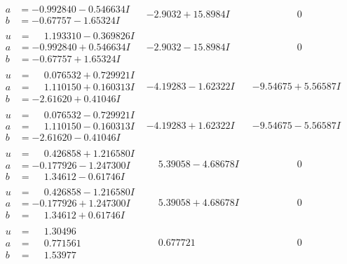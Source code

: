\documentclass[1p]{elsarticle_modified}
\theoremstyle{definition}
\begin{document}
$$\begin{array}{c|c|c}
\begin{aligned}
a &= -0.992840 - 0.546634 I \\
b &= -0.67757 - 1.65324 I\end{aligned}
 & -2.9032 + 15.8984 I & \phantom{-0.000000 } 0 \\ \hline\begin{aligned}
u &= \phantom{-}1.193310 - 0.369826 I \\
a &= -0.992840 + 0.546634 I \\
b &= -0.67757 + 1.65324 I\end{aligned}
 & -2.9032 - 15.8984 I & \phantom{-0.000000 } 0 \\ \hline\begin{aligned}
u &= \phantom{-}0.076532 + 0.729921 I \\
a &= \phantom{-}1.110150 + 0.160313 I \\
b &= -2.61620 + 0.41046 I\end{aligned}
 & -4.19283 - 1.62322 I & -9.54675 + 5.56587 I \\ \hline\begin{aligned}
u &= \phantom{-}0.076532 - 0.729921 I \\
a &= \phantom{-}1.110150 - 0.160313 I \\
b &= -2.61620 - 0.41046 I\end{aligned}
 & -4.19283 + 1.62322 I & -9.54675 - 5.56587 I \\ \hline\begin{aligned}
u &= \phantom{-}0.426858 + 1.216580 I \\
a &= -0.177926 - 1.247300 I \\
b &= \phantom{-}1.34612 - 0.61746 I\end{aligned}
 & \phantom{-}5.39058 - 4.68678 I & \phantom{-0.000000 } 0 \\ \hline\begin{aligned}
u &= \phantom{-}0.426858 - 1.216580 I \\
a &= -0.177926 + 1.247300 I \\
b &= \phantom{-}1.34612 + 0.61746 I\end{aligned}
 & \phantom{-}5.39058 + 4.68678 I & \phantom{-0.000000 } 0 \\ \hline\begin{aligned}
u &= \phantom{-}1.30496\phantom{ +0.000000I} \\
a &= \phantom{-}0.771561\phantom{ +0.000000I} \\
b &= \phantom{-}1.53977\phantom{ +0.000000I}\end{aligned}
 & \phantom{-}0.677721\phantom{ +0.000000I} & \phantom{-0.000000 } 0 \\ \hline\begin{aligned}

\end{aligned}
\end{array}$$
\end{document}
